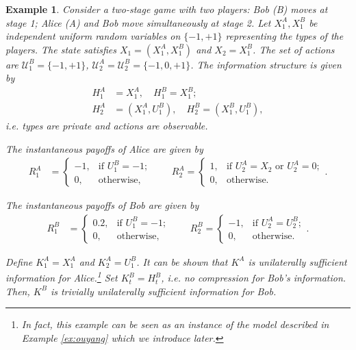 \documentclass[pdflatex,sn-basic]{sn-jnl}
\newcommand{\Comp}{K}
\theoremstyle{thmstyleone}%
\theoremstyle{thmstyletwo}%
\theoremstyle{thmstylethree}%
\newtheorem{example}{Example}
\begin{document}
\begin{example}\label{ex:wpbeproblem}
	Consider a two-stage game with two players: Bob (B) moves at stage 1; Alice (A) and Bob move simultaneously at stage 2. Let $X_1^A, X_1^B$ be independent uniform random variables on $\{-1, +1\}$ representing the types of the players. The state satisfies $X_1=(X_1^A, X_1^B)$ and $X_2=X_1^B$.  The set of actions are $\mathcal{U}_1^B = \{-1, +1\}$, $\mathcal{U}_2^A = \mathcal{U}_2^B = \{-1, 0, +1\}$. The information structure is given by
	\begin{align}
		H_1^A &= X_1^A,\quad H_1^B = X_1^B;\\
		H_2^A &= (X_1^A, U_1^B),\quad H_2^B = (X_1^B, U_1^B),
	\end{align}
	i.e. types are private and actions are observable.
	
	The instantaneous payoffs of Alice are given by
	\begin{align*}
		R_1^A &= \begin{cases}
			-1,&\text{if }U_1^B = -1;\\
			0,&\text{otherwise},
		\end{cases}\qquad
		R_2^A = \begin{cases}
			1,&\text{if }U_2^A = X_2\text{ or }U_2^A = 0;\\
			0,&\text{otherwise}.
		\end{cases}.
	\end{align*}
	
	The instantaneous payoffs of Bob are given by
	\begin{align*}
		R_1^B &= \begin{cases}
			0.2,&\text{if }U_1^B = -1;\\
			0,&\text{otherwise},
		\end{cases}\qquad
		R_2^B = \begin{cases}
			-1,&\text{if }U_2^A = U_2^B;\\
			0,&\text{otherwise}.
		\end{cases}.
	\end{align*}
	
	Define $\Comp_1^A = X_1^A$ and $\Comp_2^A = U_1^B$. It can be shown that $\Comp^A$ is unilaterally sufficient information for Alice.\footnote{In fact, this example can be seen as an instance of the model described in Example \ref{ex:ouyang} which we introduce later.} Set $\Comp_t^B = H_t^B$, i.e. no compression for Bob's information. Then, $\Comp^B$ is trivially unilaterally sufficient information for Bob.
	

\end{example}
\end{document}
